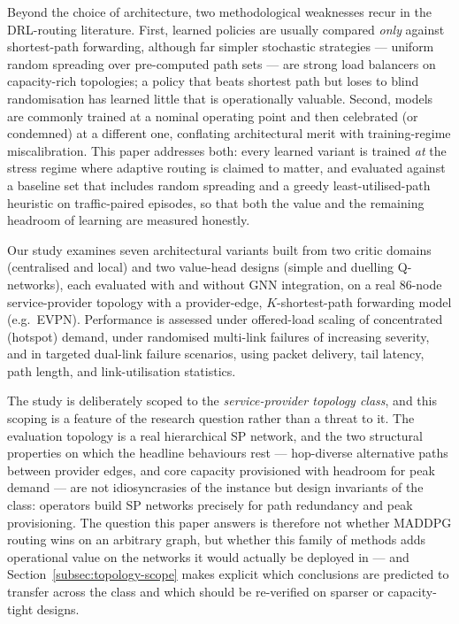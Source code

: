 \documentclass[10pt,journal,comsoc]{IEEEtran}
\begin{document}
Beyond the choice of architecture, two methodological weaknesses recur in the DRL-routing literature. First, learned policies are usually compared \emph{only} against shortest-path forwarding, although far simpler stochastic strategies --- uniform random spreading over pre-computed path sets --- are strong load balancers on capacity-rich topologies; a policy that beats shortest path but loses to blind randomisation has learned little that is operationally valuable. Second, models are commonly trained at a nominal operating point and then celebrated (or condemned) at a different one, conflating architectural merit with training-regime miscalibration. This paper addresses both: every learned variant is trained \emph{at} the stress regime where adaptive routing is claimed to matter, and evaluated against a baseline set that includes random spreading and a greedy least-utilised-path heuristic on traffic-paired episodes, so that both the value and the remaining headroom of learning are measured honestly.

Our study examines seven architectural variants built from two critic domains (centralised and local) and two value-head designs (simple and duelling Q-networks), each evaluated with and without GNN integration, on a real 86-node service-provider topology with a provider-edge, $K$-shortest-path forwarding model (e.g.\ EVPN). Performance is assessed under offered-load scaling of concentrated (hotspot) demand, under randomised multi-link failures of increasing severity, and in targeted dual-link failure scenarios, using packet delivery, tail latency, path length, and link-utilisation statistics.

The study is deliberately scoped to the \emph{service-provider topology class}, and this scoping is a feature of the research question rather than a threat to it. The evaluation topology is a real hierarchical SP network, and the two structural properties on which the headline behaviours rest --- hop-diverse alternative paths between provider edges, and core capacity provisioned with headroom for peak demand --- are not idiosyncrasies of the instance but design invariants of the class: operators build SP networks precisely for path redundancy and peak provisioning. The question this paper answers is therefore not whether MADDPG routing wins on an arbitrary graph, but whether this family of methods adds operational value on the networks it would actually be deployed in --- and Section~\ref{subsec:topology-scope} makes explicit which conclusions are predicted to transfer across the class and which should be re-verified on sparser or capacity-tight designs.
\end{document}
